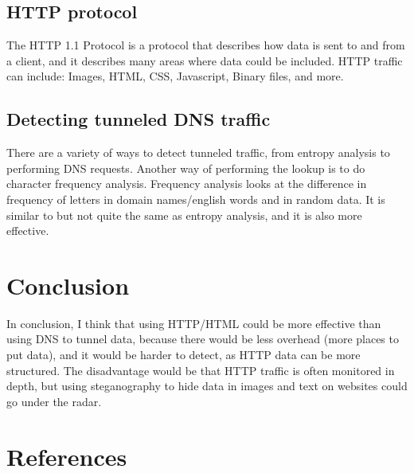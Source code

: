 \documentclass[12pt]{article}
\begin{document}
\subsection{HTTP protocol}
The HTTP 1.1 Protocol\cite{rfc2616} is a protocol that describes how data is sent to and from a client, and it describes many areas where data could be included.
HTTP traffic can include:
Images,
HTML,
CSS,
Javascript,
Binary files,
and more.

\subsection{Detecting tunneled DNS traffic}
There are a variety of ways to detect tunneled traffic, from entropy analysis to performing DNS requests\cite{detectingdns}.
Another way of performing the lookup is to do character frequency analysis\cite{freqanal}.
Frequency analysis looks at the difference in frequency of letters in domain names/english words and in random data. It is similar to but not quite the same as entropy analysis, and it is also more effective\cite{freqanal}.


\section{Conclusion}
In conclusion, I think that using HTTP/HTML could be more effective than using DNS to tunnel data, because there would be less overhead (more places to put data), and it would be harder to detect, as HTTP data can be more structured.
The disadvantage would be that HTTP traffic is often monitored in depth, but using steganography to hide data in images and text on websites could go under the radar.
\section{References}



\end{document}
